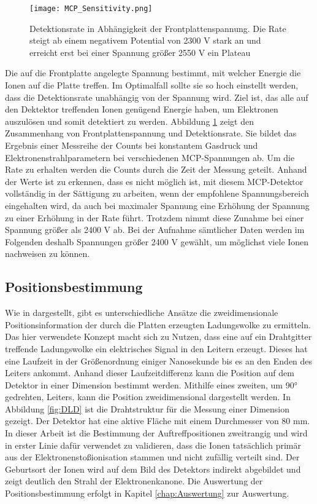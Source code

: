 \begin{figure}
    \centering
    \texttt{[image: MCP\_Sensitivity.png]}
    \caption[Detektionsrate in Abhängigkeit der Frontplattenspannung]{Detektionsrate in Abhängigkeit der Frontplattenspannung. Die Rate steigt ab einem negativem Potential von 2300 V stark an und erreicht erst bei einer Spannung größer 2550 V ein Plateau}
    \label{fig:Frontplattenspannung}
\end{figure}

Die auf die Frontplatte angelegte Spannung bestimmt, mit welcher Energie die Ionen auf die Platte treffen. Im Optimalfall sollte sie so hoch einstellt werden, dass die Detektionsrate unabhängig von der Spannung wird. Ziel ist, das alle auf den Dektektor treffenden Ionen genügend Energie haben, um Elektronen auszulösen und somit detektiert zu werden. Abbildung \ref{fig:Frontplattenspannung} zeigt den Zusammenhang von Frontplattenspannung und Detektionsrate. Sie bildet das Ergebnis einer Messreihe der Counts bei konstantem Gasdruck und Elektronenstrahlparametern bei verschiedenen MCP-Spannungen ab. Um die Rate zu erhalten werden die Counts durch die Zeit der Messung geteilt. Anhand der Werte ist zu erkennen, dass es nicht möglich ist, mit diesem MCP-Detektor vollständig in der Sättigung zu arbeiten, wenn der empfohlene Spannungsbereich eingehalten wird, da auch bei maximaler Spannung eine Erhöhung der Spannung zu einer Erhöhung in der Rate führt. Trotzdem nimmt diese Zunahme bei einer Spannung größer als 2400 V ab. Bei der Aufnahme sämtlicher Daten werden im Folgenden deshalb Spannungen größer 2400 V gewählt, um möglichst viele Ionen nachweisen zu können.

\subsection{Positionsbestimmung}
Wie in \cite{Detektorsystem} dargestellt, gibt es unterschiedliche Ansätze die zweidimensionale Positionsinformation der durch die Platten erzeugten Ladungswolke zu ermitteln. Das hier verwendete Konzept macht sich zu Nutzen, dass eine auf ein Drahtgitter treffende Ladungswolke ein elektrisches Signal in den Leitern erzeugt. Dieses hat eine Laufzeit in der Größenordnung einiger Nanosekunde bis es an den Enden des Leiters ankommt. Anhand dieser Laufzeitdifferenz kann die Position auf dem Detektor in einer Dimension bestimmt werden. Mithilfe eines zweiten, um \ang{90} gedrehten, Leiters, kann die Position zweidimensional dargestellt werden. In Abbildung \ref{fig:DLD} ist die Drahtstruktur für die Messung einer Dimension gezeigt. Der Detektor hat eine aktive Fläche mit einem Durchmesser von 80 mm. In dieser Arbeit ist die Bestimmung der Auftreffpositionen zweitrangig und wird in erster Linie dafür verwendet zu validieren, dass die Ionen tatsächlich primär aus der Elektronenstoßionisation stammen und nicht zufällig verteilt sind. Der Geburtsort der Ionen wird auf dem Bild des Detektors indirekt abgebildet und zeigt deutlich den Strahl der Elektronenkanone. Die Auswertung der Positionsbestimmung erfolgt in Kapitel \ref{chap:Auswertung} zur Auswertung.


